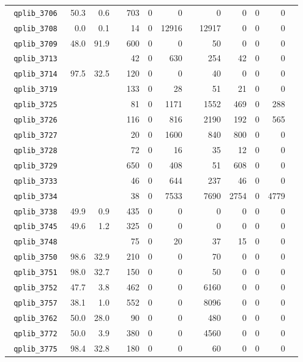 {\begin{longtable}{lrrrrrrrrrrrr}
\texttt{ 	qplib\_3706	}	&	50.3	&	0.6	&	&	703	&	0	&	0	&	&	0	&	0	&	0	&	0	\\
\texttt{ 	qplib\_3708	}	&	0.0	&	0.1	&	&	14	&	0	&	12916	&	&	12917	&	0	&	0	&	0	\\
\texttt{ 	qplib\_3709	}	&	48.0	&	91.9	&	&	600	&	0	&	0	&	&	50	&	0	&	0	&	0	\\
\texttt{ 	qplib\_3713	}	&		&		&	&	42	&	0	&	630	&	&	254	&	42	&	0	&	0	\\
\texttt{ 	qplib\_3714	}	&	97.5	&	32.5	&	&	120	&	0	&	0	&	&	40	&	0	&	0	&	0	\\
\texttt{ 	qplib\_3719	}	&		&		&	&	133	&	0	&	28	&	&	51	&	21	&	0	&	0	\\
\texttt{ 	qplib\_3725	}	&		&		&	&	81	&	0	&	1171	&	&	1552	&	469	&	0	&	288	\\
\texttt{ 	qplib\_3726	}	&		&		&	&	116	&	0	&	816	&	&	2190	&	192	&	0	&	565	\\
\texttt{ 	qplib\_3727	}	&		&		&	&	20	&	0	&	1600	&	&	840	&	800	&	0	&	0	\\
\texttt{ 	qplib\_3728	}	&		&		&	&	72	&	0	&	16	&	&	35	&	12	&	0	&	0	\\
\texttt{ 	qplib\_3729	}	&		&		&	&	650	&	0	&	408	&	&	51	&	608	&	0	&	0	\\
\texttt{ 	qplib\_3733	}	&		&		&	&	46	&	0	&	644	&	&	237	&	46	&	0	&	0	\\
\texttt{ 	qplib\_3734	}	&		&		&	&	38	&	0	&	7533	&	&	7690	&	2754	&	0	&	4779	\\
\texttt{ 	qplib\_3738	}	&	49.9	&	0.9	&	&	435	&	0	&	0	&	&	0	&	0	&	0	&	0	\\
\texttt{ 	qplib\_3745	}	&	49.6	&	1.2	&	&	325	&	0	&	0	&	&	0	&	0	&	0	&	0	\\
\texttt{ 	qplib\_3748	}	&		&		&	&	75	&	0	&	20	&	&	37	&	15	&	0	&	0	\\
\texttt{ 	qplib\_3750	}	&	98.6	&	32.9	&	&	210	&	0	&	0	&	&	70	&	0	&	0	&	0	\\
\texttt{ 	qplib\_3751	}	&	98.0	&	32.7	&	&	150	&	0	&	0	&	&	50	&	0	&	0	&	0	\\
\texttt{ 	qplib\_3752	}	&	47.7	&	3.8	&	&	462	&	0	&	0	&	&	6160	&	0	&	0	&	0	\\
\texttt{ 	qplib\_3757	}	&	38.1	&	1.0	&	&	552	&	0	&	0	&	&	8096	&	0	&	0	&	0	\\
\texttt{ 	qplib\_3762	}	&	50.0	&	28.0	&	&	90	&	0	&	0	&	&	480	&	0	&	0	&	0	\\
\texttt{ 	qplib\_3772	}	&	50.0	&	3.9	&	&	380	&	0	&	0	&	&	4560	&	0	&	0	&	0	\\
\texttt{ 	qplib\_3775	}	&	98.4	&	32.8	&	&	180	&	0	&	0	&	&	60	&	0	&	0	&	0	\\

\end{longtable}}
